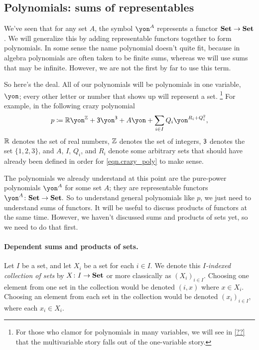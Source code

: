 \documentclass[DynamicalBook]{subfiles}
\begin{document}
\subsection{Polynomials: sums of representables}

We've seen that for any set $A$, the symbol $\yon^A$ represents a functor $\textbf{Set}\to\textbf{Set}$. We will generalize this by adding representable functors together to form polynomials. In some sense the name polynomial doesn't quite fit, because in algebra polynomials are often taken to be finite sums, whereas we will use sums that may be infinite. However, we are not the first by far to use this term.

So here's the deal. All of our polynomials will be polynomials in one variable, $\yon$; every other letter or number that shows up will represent a set.%
\footnote{For those who clamor for polynomials in many variables, we will see in \cref{??} that the multivariable story falls out of the one-variable story.}
For example, in the following crazy polynomial
\begin{equation}\label{eqn.crazy_poly}
p\coloneqq\rr\yon^\zz+\3\yon^{\3}+A\yon+\sum_{i\in I}Q_i\yon^{R_i+Q_i^2},
\end{equation}
$\mathbb{R}$ denotes the set of real numbers, $\mathbb{Z}$ denotes the set of integers, $\textsf{3}$ denotes the set $\{1,2,3\}$, and $A$, $I$, $Q_i$, and $R_i$ denote some arbitrary sets that should have already been defined in order for \eqref{eqn.crazy_poly} to make sense.

The polynomials we already understand at this point are the pure-power polynomials $\yon^A$ for some set $A$; they are representable functors $\yon^A\colon\smset\to\smset.$
So to understand general polynomials like $p$, we just need to understand sums of functors. It will be useful to discuss products of functors at the same time. However, we haven't discussed sums and products of sets yet, so we need to do that first.

\paragraph{Dependent sums and products of sets.}

Let $I$ be a set, and let $X_i$ be a set for each $i\in I$. We denote this \emph{$I$-indexed collection of sets} by $X\colon I\to\textbf{Set}$ or more classically as $(X_i)_{i\in I}$. Choosing one element from one set in the collection would be denoted $(i,x)$ where $x\in X_i$. Choosing an element from each set in the collection would be denoted $(x_i)_{i\in I}$, where each $x_i\in X_i$.
\end{document}
